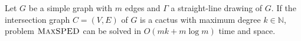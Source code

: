 \documentclass[a4paper,english,numberwithinsect]{eurocg18}
\newcommand{\maxsped}{\ensuremath{\textsc{MaxSPED}}\xspace}
\newcommand{\sollong}{\ensuremath{\textit{long}}\xspace}
\newcommand{\solmid}{\ensuremath{\textit{mid}}\xspace}
\newcommand{\solshort}{\ensuremath{\textit{short}}\xspace}
\begin{document}

\begin{theorem}
	Let $ G $ be a simple graph with $m$ edges and $ \Gamma $ a straight-line drawing of $ G $. If the intersection graph $ C = (V,E) $ of $ G $ is a cactus with maximum degree $ k \in \mathbb{N} $, problem \maxsped can be solved in $ O(mk + m \log m) $ time and space.
\end{theorem}
\end{document}

